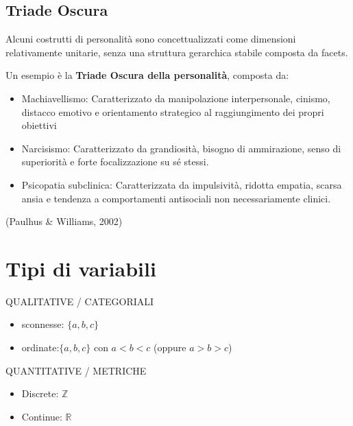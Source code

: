 \documentclass[compress]{beamer}
\begin{document}
\subsection*{Triade Oscura}

\begin{frame}

Alcuni costrutti di personalità sono concettualizzati come dimensioni relativamente unitarie, senza una struttura gerarchica stabile composta da facets.

\medskip

Un esempio è la \textbf{Triade Oscura della personalità}, composta da:

\begin{itemize}
\item Machiavellismo: Caratterizzato da manipolazione interpersonale, cinismo, distacco emotivo e orientamento strategico al raggiungimento dei propri obiettivi
\item Narcisismo: Caratterizzato da grandiosità, bisogno di ammirazione, senso di superiorità e forte focalizzazione su sé stessi.
\item Psicopatia subclinica: Caratterizzata da impulsività, ridotta empatia, scarsa ansia e tendenza a comportamenti antisociali non necessariamente clinici.
\end{itemize}

{\footnotesize (Paulhus \& Williams, 2002)}

\end{frame}


\section{Tipi di variabili}

\begin{frame}
	
	\begin{center}
	\Large  QUALITATIVE / CATEGORIALI
	\end{center}
\begin{itemize}
	\item sconnesse: $\{a,b,c\}$
	\item ordinate:$\{a,b,c\}$ con $a < b < c$ (oppure $a > b > c$)
\end{itemize}

	\begin{center}
	\Large  QUANTITATIVE / METRICHE
\end{center}
\begin{itemize}
	\item Discrete: $\mathbb{Z}$
	\item Continue: $\mathbb{R}$
\end{itemize}
\end{frame}
\end{document}
